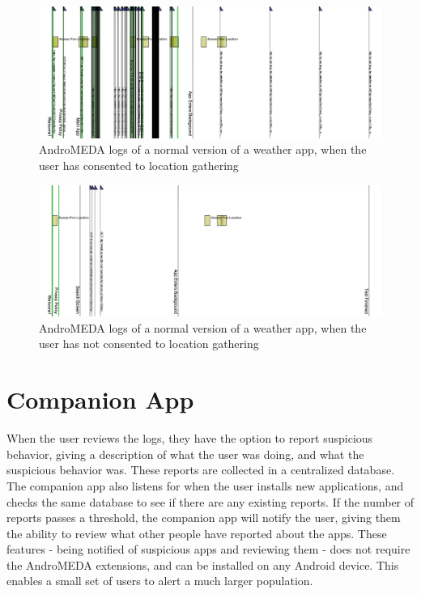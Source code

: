 \begin{figure}[h]
\begin{center}
\includegraphics[width=1.0\columnwidth]{figs/AndroMEDA_Weather_Notmalware_Location}
\caption{AndroMEDA logs of a normal version of a weather app, when the user has consented to location gathering }
\label{fig:spyware_logs_nonmalware_location}
\end{center}
\end{figure}


\begin{figure}[h]
\begin{center}
\includegraphics[width=1.0\columnwidth]{figs/AndroMEDA_Weather_Notmalware_Nolocation}
\caption{AndroMEDA logs of a normal version of a weather app, when the user has not consented to location gathering }
\label{fig:spyware_logs_nonmalware_noloc}
\end{center}
\end{figure}

\section{Companion App}
When the user reviews the logs, they have the option to report suspicious behavior, giving a description of what the user was doing, and what the suspicious behavior was. These reports are collected in a centralized database. The companion app also listens for when the user installs new applications, and checks the same database to see if there are any existing reports. If the number of reports passes a threshold, the companion app will notify the user, giving them the ability to review what other people have reported about the apps. These features - being notified of suspicious apps and reviewing them - does not require the AndroMEDA extensions, and can be installed on any Android device. This enables a small set of users to alert a much larger population.

